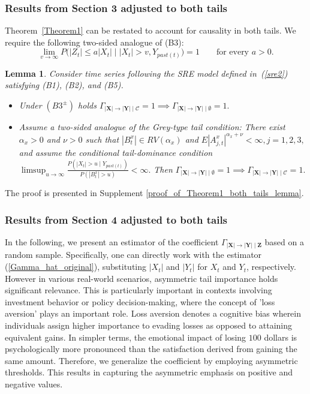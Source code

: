 \documentclass[a4paper,11pt]{article}
\newtheorem{lemma}{Lemma}
\begin{document}
\subsubsection{Results from Section 3 adjusted to both tails}
\label{appendix_both_tails_section3}
Theorem~\ref{Theorem1} can be restated to account for causality in both tails. We require the following two-sided analogue of (B3):
\[
\tag{B3$^\pm$}
\lim_{v\to\infty}
P\bigl(|Z_t|\leq a|X_t| \mid |X_t|>v,Y_{past(t)}\bigr)=1
\qquad\text{for every }a>0.
\]

\begin{lemma}\label{Theorem1_both_tails_lemma}
Consider time series following the SRE model defined in~(\ref{sre2}) satisfying
(B1), (B2), and (B5). 

\begin{itemize}
    \item Under $ (B3^{\pm})$ holds \(
\Gamma_{|\mathbf X|\to|\mathbf Y|\mid\mathcal C}=1
\implies
\Gamma_{|\mathbf X|\to|\mathbf Y|\mid\emptyset}=1.
\)

 \item Assume a two-sided analogue of the Grey-type tail condition: There exist
\(\alpha_x>0\) and \(\nu>0\) such that \(|B_t^x|\in RV(\alpha_x)\) and
\(
E|A^x_{j,t}|^{\alpha_x+\nu}<\infty,
 j=1,2,3,
\)
and assume the conditional tail-dominance condition
\(
\limsup_{u\to\infty}
\frac{P(|X_t|>u \mid Y_{past(t)})}{P(|B_t^x|>u)}
<\infty.
\) Then \(
\Gamma_{|\mathbf X|\to|\mathbf Y|\mid\emptyset}=1
\implies
\Gamma_{|\mathbf X|\to|\mathbf Y|\mid\mathcal C}=1.
\)
\end{itemize}
\end{lemma}
The proof is presented in Supplement \ref{proof_of_Theorem1_both_tails_lemma}. 

\subsubsection{Results from Section 4 adjusted to both tails}
\label{appendix_both_tails_section4}

In the following, we present an estimator of the coefficient \(\Gamma_{|\textbf{X}|\to|\textbf{Y}|\mid \textbf{Z}}\) based on a random sample. Specifically, one can directly work with the estimator (\ref{Gamma_hat_original}), substituting \(|X_t|\) and \(|Y_t|\) for \(X_t\) and \(Y_t\), respectively. However in various real-world scenarios, asymmetric tail importance holds significant relevance. This is particularly important in contexts involving investment behavior or policy decision-making, where the concept of 'loss aversion' plays an important role. Loss aversion denotes a cognitive bias wherein individuals assign higher importance to evading losses as opposed to attaining equivalent gains. In simpler terms, the emotional impact of losing $100$ dollars is psychologically more pronounced than the satisfaction derived from gaining the same amount. Therefore, we generalize the coefficient by employing asymmetric thresholds. This results in capturing the asymmetric emphasis on positive and negative values.
\end{document}
